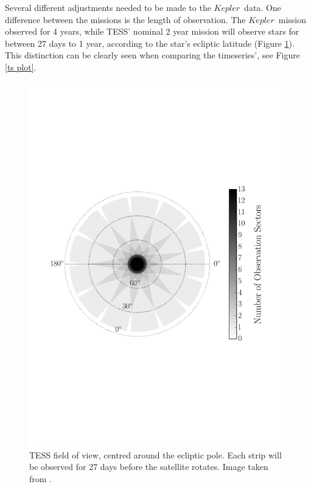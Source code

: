 \documentclass[a4paper,fleqn,usenatbib,useAMS]{mnras}
\newcommand{\kep}{\ensuremath{Kepler}\:}
\begin{document}
Several different adjustments needed to be made to the \kep \ data. One difference between the missions is the length of observation. The \kep \ mission observed for 4 years, while TESS' nominal 2 year mission will observe stars for between 27 days to 1 year, according to the star's ecliptic latitude (Figure \ref{TESS field}). This distinction can be clearly seen when comparing the timeseries', see Figure \ref{ts plot}.

\begin{figure}
	\centering
	\includegraphics[scale=0.4]{cropped_TESSfield.pdf}
	\caption{TESS field of view, centred around the ecliptic pole. Each strip will be observed for 27 days before the satellite rotates. Image taken from \citet{campante_asteroseismic_2016}.}	
	\label{TESS field}
\end{figure} 
\end{document}
